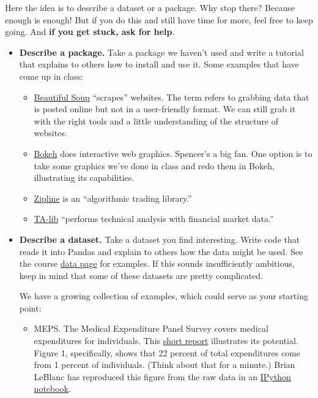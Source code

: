 \documentclass[11pt]{article}
\begin{document}
Here the idea is to describe a dataset or a package.
Why stop there?  Because enough is enough!  But if you do this and still have time
for more, feel free to keep going.
And {\bf if you get stuck, ask for help}.
\begin{itemize}

\item {\bf Describe a package.\/}
Take a package we haven't used and write a tutorial that explains to others how to install
and use it.  Some examples that have come up in class:

\begin{itemize}
\item \href{http://www.crummy.com/software/BeautifulSoup/bs4/doc/}
{Beautiful Soup} ``scrapes''  websites.
The term refers to grabbing data that is posted online but not in a user-friendly format.
We can still grab it with the right tools and a little understanding of the structure
of websites.

\item \href{http://bokeh.pydata.org/en/latest/docs/gallery.html}{Bokeh} does interactive web graphics.
Spencer's a big fan.
One option is to take some graphics we've done in class and redo them in Bokeh,
illustrating its capabilities.

\item \href{https://github.com/quantopian/zipline}{Zipline} is an
``algorithmic trading library.''

\item \href{https://github.com/mrjbq7/ta-lib}{TA-lib}
``performs technical analysis with financial market data.''
\end{itemize}


\item {\bf Describe a dataset.\/}
Take a dataset you find interesting.  Write code that reads it into Pandas
and explain to others how the data might be used.
See the course \href{}{data page}
for examples.
If this sounds insufficiently ambitious, keep in mind that some of these datasets
are pretty complicated.

We have a growing collection of examples, which could serve as your starting point:
\begin{itemize}
\item MEPS.  The Medical Expenditure Panel Survey covers medical expenditures for individuals.
This \href{http://www.nihcm.org/pdf/DataBrief3 Final.pdf}{short report} illustrates its potential.
Figure 1, specifically, shows that 22 percent of total expenditures come
from 1 percent of individuals.
(Think about that for a minute.)
Brian LeBlanc has reproduced this figure from the raw data in an
\href{https://github.com/DaveBackus/Data_Bootcamp/blob/master/Code/Lab/MEPS_data_experiment_Brian.ipynb}
{IPython notebook}.


\end{itemize}
\end{itemize}
\end{document}

